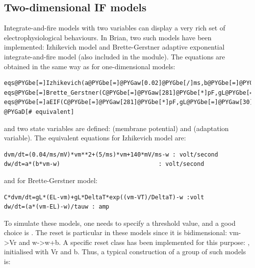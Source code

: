 \documentclass[letterpaper,10pt]{manual}
\begin{document}
\subsection{Two-dimensional IF models}

Integrate-and-fire models with two variables can display a very rich set of electrophysiological behaviours.
In Brian, two such models have been implemented: Izhikevich model and Brette-Gerstner adaptive exponential
integrate-and-fire model (also included in the  module).
The equations are obtained in the same way as for one-dimensional models:

\begin{Verbatim}[commandchars=@\[\]]
eqs@PYGbe[=]Izhikevich(a@PYGbe[=]@PYGaw[0.02]@PYGbe[/]ms,b@PYGbe[=]@PYGaw[0.2]@PYGbe[/]ms)
eqs@PYGbe[=]Brette_Gerstner(C@PYGbe[=]@PYGaw[281]@PYGbe[*]pF,gL@PYGbe[=]@PYGaw[30]@PYGbe[*]nS,EL@PYGbe[=]@PYGbe[-]@PYGaw[70.6]@PYGbe[*]mV,VT@PYGbe[=]@PYGbe[-]@PYGaw[50.4]@PYGbe[*]mV,DeltaT@PYGbe[=]@PYGaw[2]@PYGbe[*]mV,tauw@PYGbe[=]@PYGaw[144]@PYGbe[*]ms,a@PYGbe[=]@PYGaw[4]@PYGbe[*]nS)
eqs@PYGbe[=]aEIF(C@PYGbe[=]@PYGaw[281]@PYGbe[*]pF,gL@PYGbe[=]@PYGaw[30]@PYGbe[*]nS,EL@PYGbe[=]@PYGbe[-]@PYGaw[70.6]@PYGbe[*]mV,VT@PYGbe[=]@PYGbe[-]@PYGaw[50.4]@PYGbe[*]mV,DeltaT@PYGbe[=]@PYGaw[2]@PYGbe[*]mV,tauw@PYGbe[=]@PYGaw[144]@PYGbe[*]ms,a@PYGbe[=]@PYGaw[4]@PYGbe[*]nS) @PYGaD[# equivalent]
\end{Verbatim}

and two state variables are defined:  (membrane potential) and  (adaptation variable).
The equivalent equations for Izhikevich model are:

\begin{Verbatim}[commandchars=@\[\]]
dvm/dt=(0.04/ms/mV)*vm**2+(5/ms)*vm+140*mV/ms-w : volt/second
dw/dt=a*(b*vm-w)                            : volt/second
\end{Verbatim}

and for Brette-Gerstner model:

\begin{Verbatim}[commandchars=@\[\]]
C*dvm/dt=gL*(EL-vm)+gL*DeltaT*exp((vm-VT)/DeltaT)-w :volt
dw/dt=(a*(vm-EL)-w)/tauw : amp
\end{Verbatim}

To simulate these models, one needs to specify a threshold value, and a good choice is
. The reset is particular in these models since it is bidimensional:
vm-\textgreater{}Vr and w-\textgreater{}w+b. A specific reset class has been implemented for this purpose:
, initialised with Vr and b. Thus, a typical construction of a group of
such models is:
\end{document}
